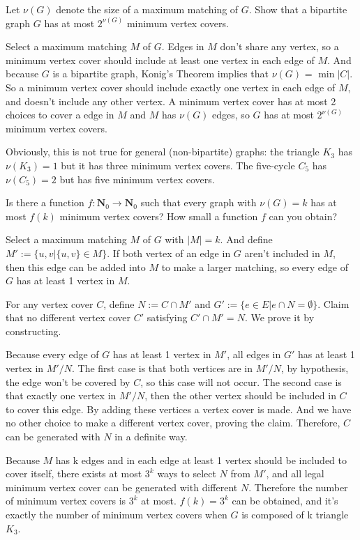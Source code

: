 \documentclass[11pt,a4paper,oneside]{article}
\begin{document}
\begin{problem}{6}
	\statement
    Let $\nu(G)$ denote the size of a maximum matching of $G$. Show that a bipartite graph $G$
    has at most $2^{\nu(G)}$ minimum vertex covers.
    
    \solution
    Select a maximum matching $M$ of $G$. 
    Edges in $M$ don't share any vertex, so a minimum vertex cover should include at least one vertex in each edge of $M$. 
	And because $G$ is a bipartite graph, Konig's Theorem implies that $\nu(G)$ = $\min|C|$. 
    So a minimum vertex cover should include exactly one vertex in each edge of $M$, and doesn't include any other vertex. 
    A minimum vertex cover has at most 2 choices to cover a edge in $M$ and $M$ has $\nu(G)$ edges, 
    so $G$ has at most $2^{\nu(G)}$ minimum vertex covers. 
\end{problem}

Obviously, this is not  true for general (non-bipartite) graphs: the triangle $K_3$ has $\nu(K_3) = 1$ but it has 
three minimum vertex covers. The five-cycle $C_5$ has $\nu(C_5) = 2$ but has five minimum vertex covers.

\begin{problem}{7}
	\statement
   Is there a function $f: \mathbf{N}_0 \rightarrow \mathbf{N}_0$ such that every graph with $\nu(G) = k$ has 
   at most $f(k)$ minimum vertex covers? How small a function $f$ can you obtain?
   
    \solution   
    Select a maximum matching $M$ of $G$ with $|M|=k$. And define $M' := \{u, v|\{u, v\} \in M\}$.
    If both vertex of an edge in $G$ aren't included in $M$, then this edge can be added into $M$ to make a larger matching, 
    so every edge of $G$ has at least 1 vertex in $M$.
    
	
	For any vertex cover $C$, define $N := C\cap M'$ and $G' :=\{ e\in E | e\cap N=\emptyset\}$. Claim that no different vertex cover $C'$ satisfying $C' \cap M' = N$. We prove it by constructing.
	
	Because every edge of $G$ has at least 1 vertex in $M'$, all edges in $G'$ has at least 1 vertex in $M'/N$. The first case is that both vertices are in $M'/N$, by hypothesis, the edge won't be covered by $C$, so this case will not occur. The second case is that exactly one vertex in $M'/N$, then the other vertex should be included in $C$ to cover this edge. 
	By adding these vertices a vertex cover is made. And we have no other choice to make a different vertex cover, proving the claim.
	Therefore, $C$ can be generated with $N$ in a definite way.

	Because $M$ has k edges and in each edge at least 1 vertex should be included to cover itself, there exists at most $3^k$ ways to select $N$ from $M'$, and all legal minimum vertex cover can be generated with different $N$.
	Therefore the number of minimum vertex covers is $3^k$ at most.
	$f(k)=3^k$ can be obtained, and it's exactly the number of minimum vertex covers when $G$ is composed of k triangle $K_3$.
\end{problem}
\end{document}
